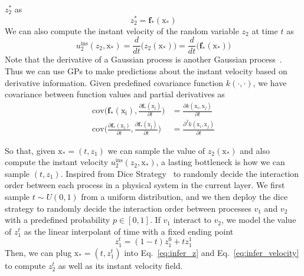 \documentclass{article}
\begin{document}
$z_2^*$ as
\begin{equation}
    z_2^* = \mathbf{f}_{*} (\mathrm{x}_{*}) \label{eq:infer_z}
\end{equation}
We can also compute the instant velocity of the random variable $z_2$ at time $t$ as 
\begin{equation}
    u^{\text{ins}}_2 (z_2, \mathrm{x}_{*}) = \frac{d}{dt} \Big(  z_2(\mathrm{x}_{*}) \Big) = \frac{d}{dt} \Big(  \mathbf{f}_{*}(\mathrm{x}_{*}) \Big) \label{eq:infer_velocity}
\end{equation}
Note that the derivative of a Gaussian process is another Gaussian process~\cite{Rasmussen2006Gaussian}. Thus we can use GPs to make predictions about the instant velocity based on derivative information. Given predefined covariance function $k(\cdot , \cdot)$, we have covariance between function values and
partial derivatives as
\begin{align}
    \text{cov}\Big(\mathbf{f}_*(\mathrm{x_i}), \frac{\partial \mathbf{f}_*(\mathrm{x_j})}{\partial t}\Big) &= \frac{\partial k(\mathrm{x}_i, \mathrm{x}_j)}{\partial t}  \\ \nonumber
    \text{cov}\Big(\frac{ \partial \mathbf{f}_*(\mathrm{x_i})}{ \partial t}, \frac{\partial \mathbf{f}_*(\mathrm{x_j})}{\partial t}\Big) &= \frac{\partial^2 k(\mathrm{x}_i, \mathrm{x}_j)}{\partial t}
\end{align}

So that, given $\mathrm{x}_* =(t, z_1)$ we can sample the value of $z_2(\mathrm{x}_*)$ and also compute the instant velocity $u^{\text{ins}}_2 (z_2, \mathrm{x}_*)$, a lasting bottleneck is how we can sample $(t, z_1)$. Inspired from Dice Strategy~\citep{xiao2023coupled} to randomly decide the interaction order between each process in a physical system in the current layer. We first sample $t \sim U(0,1)$ from a uniform distribution, and we then deploy the dice strategy to randomly decide the interaction order between processes $v_1$ and $v_2$ with a predefined probability $p \in [0,1]$. If $v_1$ interact to $v_2$, we model the value of $z^t_1$ as the linear interpolant of time with a fixed ending point
\begin{equation}
    z^t_1 = (1-t)z^0_1 + t z^1_1
\end{equation}
Then, we can plug $\mathrm{x}_* =(t, z^t_1)$ into Eq.~\ref{eq:infer_z} and Eq.~\ref{eq:infer_velocity} to compute $z^t_2$ as well as its instant velocity field.
\end{document}
